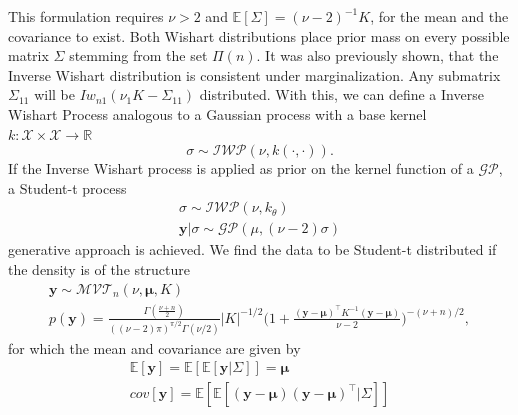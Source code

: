 This formulation requires $\nu > 2$ and $\mathbb{E}[\Sigma] = (\nu-2)^{-1}K$, for the mean and the covariance to exist. Both Wishart distributions place prior mass on every possible matrix $\Sigma$ stemming from the set $\Pi(n)$. It was also previously shown, that the Inverse Wishart distribution is consistent under marginalization. Any submatrix $\Sigma_{11}$ will be $Iw_{n1}(\nu_1K-\Sigma_{11})$ distributed. With this, we can define a Inverse Wishart Process analogous to a Gaussian process with a base kernel $k:\mathcal{X} \times \mathcal{X}\to \mathbb{R}$
\begin{equation}%
	\sigma \sim \mathcal{IWP}(\nu,k(\cdot,\cdot)).
\label{eq: Inverse Wishart Process}
\end{equation}
If the Inverse Wishart process is applied as prior on the kernel function of a $\mathcal{GP}$, a Student-t process 
\begin{subequations}%
	\label{eq:Student-t process}
	\begin{align}
	\sigma \sim \mathcal{IWP}(\nu,k_\theta)         \label{eq:inverse wishart covariance kernel} \\
	\bm{y}|\sigma \sim \mathcal{GP}(\mu, (\nu-2)\sigma)         \label{eq:hierarchical gaussian process with iwp kernel}
	\end{align}
\end{subequations}
generative approach is achieved. We find the data to be Student-t distributed if the density is of the structure
\begin{subequations}%
	\label{eq:multivariate Student-t distributed data}
	\begin{align}
	\bm{y} \sim \mathcal{MVT}_n(\nu,\bm{\mu},K)         \label{eq:multivariate Student-t shorthand} \\
	p(\bm{y}) = \frac{\Gamma(\frac{\nu+n}{2})}{((\nu-2)\pi)^{\pi/2}\Gamma(\nu/2)}|K|^{-1/2}\Big(1+\frac{(\bm{y}-\bm{\mu})^{\top}K^{-1}(\bm{y}-\bm{\mu})}{\nu-2}\Big)^{-(\nu+n)/2} ,        \label{eq:multivariate Student-t distributed data def}
	\end{align}
\end{subequations}
for which the mean and covariance are given by
\begin{subequations}%
	\label{eq:mean and cov studt}
	\begin{align}
	\mathbb{E}[\bm{y}] = \mathbb{E}[\mathbb{E}[\bm{y}|\Sigma]] = \bm{\mu}         \label{eq:mean studt} \\
	cov[\bm{y}] = \mathbb{E}[\mathbb{E}[(\bm{y}-\bm{\mu})(\bm{y}-\bm{\mu})^{\top}|\Sigma]]         \label{eq:cov studt}
	\end{align}
\end{subequations}
